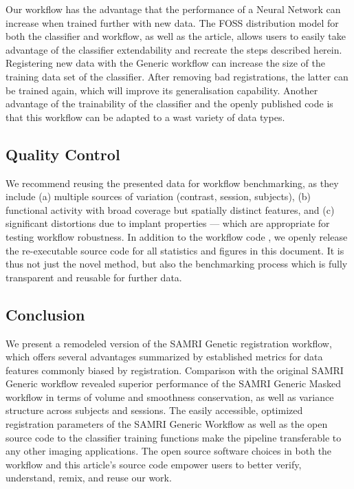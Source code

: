 Our workflow has the advantage that the performance of a Neural Network can increase when trained further with new data.
The FOSS distribution model for both the classifier and workflow, as well as the article, allows users to easily take advantage of the classifier extendability and recreate the steps described herein.
Registering new data with the Generic workflow can increase the size of the training data set of the classifier.
After removing bad registrations, the latter can be trained again, which will improve its generalisation capability.
Another advantage of the trainability of the classifier and the openly published code is that this workflow can be adapted to a wast variety of data types.

\subsection{Quality Control}

We recommend reusing the presented data for workflow benchmarking, as they include (a) multiple sources of variation (contrast, session, subjects), (b) functional activity with broad coverage but spatially distinct features, and (c) significant distortions due to implant properties --- which are appropriate for testing workflow robustness.
In addition to the workflow code \cite{mlebe, samri}, we openly release the re-executable source code \cite{mlebe_repsep} for all statistics and figures in this document.
It is thus not just the novel method, but also the benchmarking process which is fully transparent and reusable for further data.

\subsection{Conclusion}

We present a remodeled version of the SAMRI Genetic registration workflow, which offers several advantages summarized by established metrics for data features commonly biased by registration.
Comparison with the original SAMRI Generic workflow revealed superior performance of the SAMRI Generic Masked workflow in terms of volume and smoothness conservation, as well as variance structure across subjects and sessions.
The easily accessible, optimized registration parameters of the SAMRI Generic Workflow as well as the open source code to the classifier training functions make the pipeline transferable to any other imaging applications.
The open source software choices in both the workflow and this article's source code empower users to better verify, understand, remix, and reuse our work.
